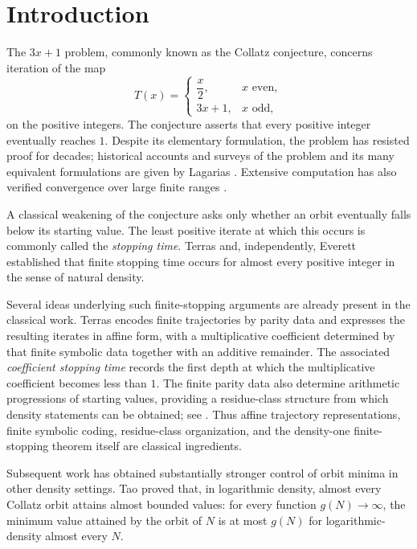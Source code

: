 \documentclass[12pt, oneside]{article}
\numberwithin{equation}{section}
\theoremstyle{definition}
\theoremstyle{plain}
\theoremstyle{remark}
\begin{document}
\newpage
\tableofcontents

\newpage
\section{Introduction}

The \(3x+1\) problem, commonly known as the Collatz conjecture, concerns
iteration of the map
\[
T(x)=
\begin{cases}
\dfrac{x}{2}, & x \text{ even},\\[6pt]
3x+1, & x \text{ odd},
\end{cases}
\]
on the positive integers. The conjecture asserts that every positive integer
eventually reaches \(1\). Despite its elementary formulation, the problem
has resisted proof for decades; historical accounts and surveys of the
problem and its many equivalent formulations are given by Lagarias
\cite{Lagarias2010}. Extensive computation has also verified convergence
over large finite ranges \cite{OliveiraESilva1999}.

A classical weakening of the conjecture asks only whether an orbit eventually
falls below its starting value. The least positive iterate at which this
occurs is commonly called the \emph{stopping time}. Terras
\cite{Terras1976} and, independently, Everett \cite{Everett1977} established
that finite stopping time occurs for almost every positive integer in the
sense of natural density.

Several ideas underlying such finite-stopping arguments are already present
in the classical work. Terras encodes finite trajectories by parity data and
expresses the resulting iterates in affine form, with a multiplicative
coefficient determined by that finite symbolic data together with an
additive remainder. The associated \emph{coefficient stopping time} records
the first depth at which the multiplicative coefficient becomes less than
\(1\). The finite parity data also determine arithmetic progressions of
starting values, providing a residue-class structure from which density
statements can be obtained; see \cite{Terras1976,Lagarias2010}. Thus affine
trajectory representations, finite symbolic coding, residue-class
organization, and the density-one finite-stopping theorem itself are
classical ingredients.

Subsequent work has obtained substantially stronger control of orbit minima
in other density settings. Tao \cite{Tao2019} proved that, in logarithmic
density, almost every Collatz orbit attains almost bounded values: for every
function \(g(N)\to\infty\), the minimum value attained by the orbit of \(N\)
is at most \(g(N)\) for logarithmic-density almost every \(N\).
\end{document}
